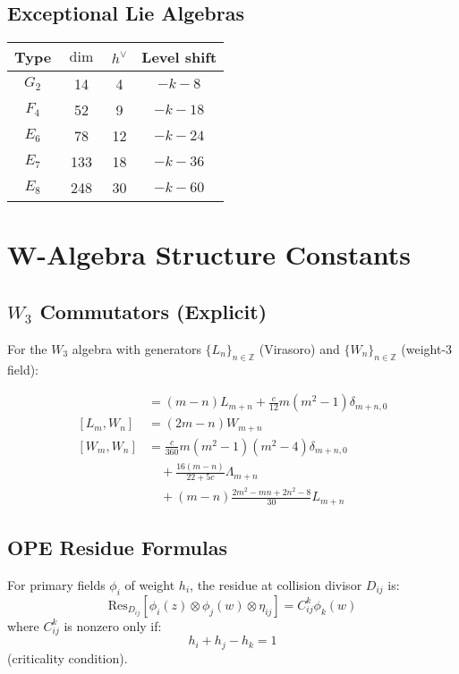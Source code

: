 \subsection{Exceptional Lie Algebras}

\begin{center}
\begin{tabular}{|c|c|c|c|}
\hline
Type & $\dim$ & $h^\vee$ & Level shift \\
\hline
$G_2$ & 14 & 4 & $-k-8$ \\
\hline
$F_4$ & 52 & 9 & $-k-18$ \\
\hline
$E_6$ & 78 & 12 & $-k-24$ \\
\hline
$E_7$ & 133 & 18 & $-k-36$ \\
\hline
$E_8$ & 248 & 30 & $-k-60$ \\
\hline
\end{tabular}
\end{center}

\section{W-Algebra Structure Constants}

\subsection{$W_3$ Commutators (Explicit)}

For the $W_3$ algebra with generators $\{L_n\}_{n \in \mathbb{Z}}$ (Virasoro) and $\{W_n\}_{n \in \mathbb{Z}}$ (weight-3 field):

\begin{align}
[L_m, L_n] &= (m-n)L_{m+n} + \frac{c}{12}m(m^2-1)\delta_{m+n,0} \\
[L_m, W_n] &= (2m-n)W_{m+n} \\
[W_m, W_n] &= \frac{c}{360}m(m^2-1)(m^2-4)\delta_{m+n,0} \\
&\quad + \frac{16(m-n)}{22+5c}\Lambda_{m+n} \\
&\quad + (m-n)\frac{2m^2 - mn + 2n^2 - 8}{30}L_{m+n}
\end{align}

\subsection{OPE Residue Formulas}

For primary fields $\phi_i$ of weight $h_i$, the residue at collision divisor $D_{ij}$ is:
$$\text{Res}_{D_{ij}}[\phi_i(z) \otimes \phi_j(w) \otimes \eta_{ij}] = C^k_{ij} \phi_k(w)$$
where $C^k_{ij}$ is nonzero only if:
$$h_i + h_j - h_k = 1$$
(criticality condition).

